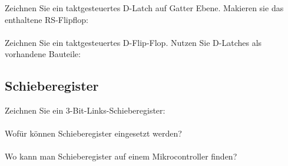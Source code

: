\subsubsection{}
Zeichnen Sie ein taktgesteuertes D-Latch auf Gatter Ebene. Makieren sie das enthaltene RS-Flipflop:\\
\\[0.3cm]
Zeichnen Sie ein taktgesteuertes D-Flip-Flop. Nutzen Sie D-Latches als vorhandene Bauteile:\\

\subsection{Schieberegister}
Zeichnen Sie ein 3-Bit-Links-Schieberegister:\\
\\[0.3cm]
Wofür können Schieberegister eingesetzt werden?\\
\\[0.3cm]
Wo kann man Schieberegister auf einem Mikrocontroller finden?\\
